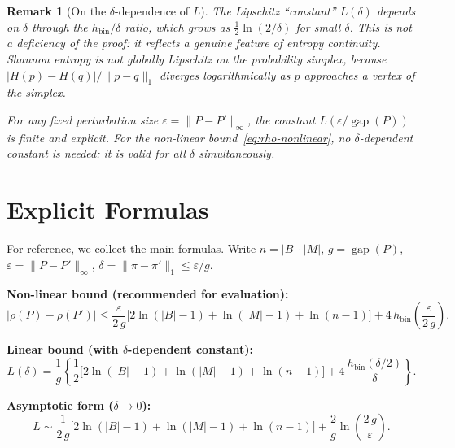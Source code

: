 \documentclass[11pt,a4paper]{article}
\newtheorem{remark}[theorem]{Remark}
\DeclareMathOperator{\gap}{gap}
\begin{document}
\begin{remark}[On the $\delta$-dependence of $L$]\label{rem:delta-dep}
The Lipschitz ``constant'' $L(\delta)$ depends on $\delta$ through
the $h_{\mathrm{bin}}/\delta$ ratio, which grows as $\frac{1}{2}\ln(2/\delta)$
for small $\delta$.  This is not a deficiency of the proof: it reflects
a genuine feature of entropy continuity.  Shannon entropy is \emph{not}
globally Lipschitz on the probability simplex, because
$|H(p) - H(q)|/\|p-q\|_1$ diverges logarithmically as $p$ approaches
a vertex of the simplex.

For any \emph{fixed} perturbation size $\varepsilon = \|P - P'\|_\infty$,
the constant $L(\varepsilon/\gap(P))$ is finite and explicit.
For the non-linear bound~\eqref{eq:rho-nonlinear}, no $\delta$-dependent
constant is needed: it is valid for all $\delta$ simultaneously.
\end{remark}


\section{Explicit Formulas}\label{sec:explicit}

For reference, we collect the main formulas.  Write $n = |B|\cdot|M|$,
$g = \gap(P)$, $\varepsilon = \|P - P'\|_\infty$,
$\delta = \|\pi - \pi'\|_1 \le \varepsilon/g$.

\medskip\noindent
\textbf{Non-linear bound (recommended for evaluation):}
\begin{equation}\label{eq:nonlinear-final}
  |\rho(P) - \rho(P')| \le
  \frac{\varepsilon}{2\,g}\bigl[2\ln(|B|-1) + \ln(|M|-1) + \ln(n-1)\bigr]
  + 4\,h_{\mathrm{bin}}\!\left(\frac{\varepsilon}{2\,g}\right).
\end{equation}

\noindent
\textbf{Linear bound (with $\delta$-dependent constant):}
\begin{equation}\label{eq:L-collected}
  L(\delta) = \frac{1}{g}\left\{
    \frac{1}{2}\bigl[2\ln(|B|-1) + \ln(|M|-1) + \ln(n-1)\bigr]
    + 4\,\frac{h_{\mathrm{bin}}(\delta/2)}{\delta}
  \right\}.
\end{equation}

\noindent
\textbf{Asymptotic form ($\delta \to 0$):}
\begin{equation}\label{eq:L-asymptotic}
  L \sim \frac{1}{2\,g}\bigl[2\ln(|B|-1) + \ln(|M|-1) + \ln(n-1)\bigr]
  + \frac{2}{g}\ln\!\left(\frac{2\,g}{\varepsilon}\right).
\end{equation}
\end{document}
